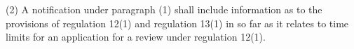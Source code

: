 \documentclass[12pt,a4paper]{article}
\begin{document}
(2) A notification under paragraph (1) shall include information as to the provisions of regulation 12(1) and regulation 13(1) in so far as it relates to time limits for an application for a review under regulation 12(1).


%
%
%
%
\end{document}
